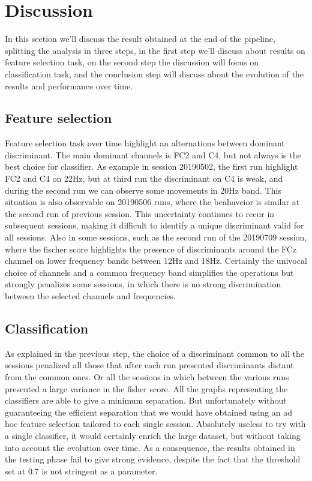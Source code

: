 \newpage
\section{Discussion}\label{sec:target_of_the_project} 
In this section we'll discuss the result obtained at the end of the pipeline, splitting the analysis in three steps, in the first step we'll discuss about results on feature selection task, on the second step the discussion will focus on classification task, and the conclusion step will discuss about the evolution of the results and performance over time.
\subsection{Feature selection}\label{subsec:status}
Feature selection task over time highlight an alternations between dominant discriminant. The main dominant channels is FC2 and C4, but not always is the best choice for classifier. As example in session 20190502, the first run highlight FC2 and C4 on 22Hz, but at third run the discriminant on C4 is weak, and during the second run we can observe some movements in 20Hz band. This situation is also observable on 20190506 runs, where the beahaveior is similar at the second run of previous session.
This uncertainty continues to recur in subsequent sessions, making it difficult to identify a unique discriminant valid for all sessions. Also in some sessions, such as the second run of the 20190709 session, where the fischer score highlights the presence of discriminants around the FCz channel on lower frequency bands between 12Hz and 18Hz. Certainly the univocal choice of channels and a common frequency band simplifies the operations but strongly penalizes some sessions, in which there is no strong discrimination between the selected channels and frequencies.
\subsection{Classification}\label{subsec:status}
As explained in the previous step, the choice of a discriminant common to all the sessions penalized all those that after each run presented discriminants distant from the common ones. Or all the sessions in which between the various runs presented a large variance in the fisher score.
All the graphs representing the classifiers are able to give a minimum separation. But unfortunately without guaranteeing the efficient separation that we would have obtained using an ad hoc feature selection tailored to each single session. Absolutely useless to try with a single classifier, it would certainly enrich the large dataset, but without taking into account the evolution over time. 
As a consequence, the results obtained in the testing phase fail to give strong evidence, despite the fact that the threshold set at 0.7 is not stringent as a parameter.
